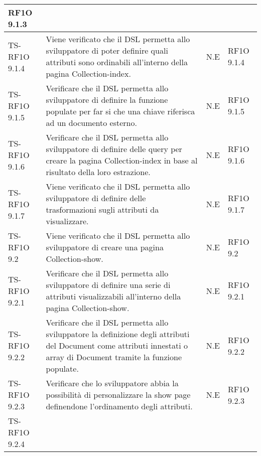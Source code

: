\begin{center}
\begin{longtable}{| p{3cm} | p{6cm} | p{1.5cm} | p{2cm} | }
            RF1O 9.1.3 \newline  \\ \hline 
        TS-RF1O 9.1.4 & 
        Viene verificato che il DSL permetta allo sviluppatore di poter definire quali attributi sono ordinabili all’interno della pagina Collection-index. & N.E &       
            RF1O 9.1.4 \newline  \\ \hline 
        TS-RF1O 9.1.5 & 
        Verificare che il DSL permetta allo sviluppatore di definire la funzione populate per far si che una chiave riferisca ad un documento esterno. & N.E &       
            RF1O 9.1.5 \newline  \\ \hline 
        TS-RF1O 9.1.6 & 
        Verificare che il DSL permetta allo sviluppatore di definire delle query per creare la pagina Collection-index in base al risultato della loro estrazione. & N.E &       
            RF1O 9.1.6 \newline  \\ \hline 
        TS-RF1O 9.1.7 & 
        Viene verificato che il DSL permetta allo sviluppatore di definire delle trasformazioni sugli attributi da visualizzare. & N.E &       
            RF1O 9.1.7 \newline  \\ \hline 
        TS-RF1O 9.2 & 
        Viene verificato che il DSL permetta allo sviluppatore di creare una pagina Collection-show. & N.E &       
            RF1O 9.2 \newline  \\ \hline 
        TS-RF1O 9.2.1 & 
        Verificare che il DSL permetta allo sviluppatore di definire una serie di attributi visualizzabili all’interno della pagina Collection-show. & N.E &       
            RF1O 9.2.1 \newline  \\ \hline 
        TS-RF1O 9.2.2 & 
        Verificare che il DSL permetta allo sviluppatore la definizione degli attributi del Document come attributi innestati o array di Document tramite la funzione populate. & N.E &       
            RF1O 9.2.2 \newline  \\ \hline 
        TS-RF1O 9.2.3 & 
        Verificare che lo sviluppatore abbia la possibilità di personalizzare la show page definendone l’ordinamento degli attributi. & N.E &       
            RF1O 9.2.3 \newline  \\ \hline 
        TS-RF1O 9.2.4 & 

\end{longtable}
\end{center}
